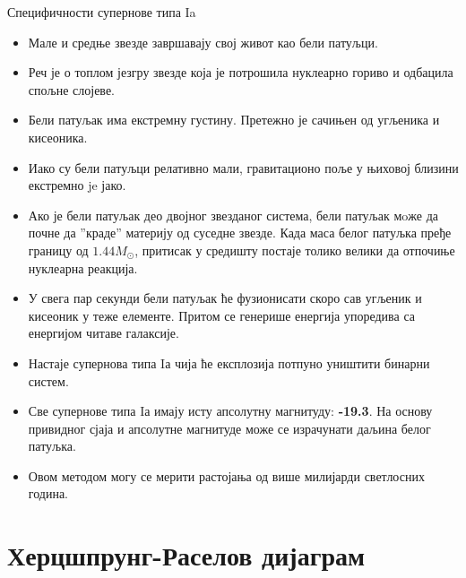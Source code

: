 \documentclass[aspectratio=169, xcolor=table, 10pt]{beamer}
\theoremstyle{definition}
\begin{document}
\begin{frame}{Специфичности супернове типа Ia}
  \begin{itemize}
    \item Мале и средње звезде завршавају свој живот као бели патуљци.
    \item Реч је о топлом језгру звезде која је потрошила нуклеарно гориво и одбацила спољне слојеве.
    \item Бели патуљак има екстремну густину. Претежно је сачињен од угљеника и кисеоника.
    \item Иако су бели патуљци релативно мали, гравитационо поље у њиховој близини екстремно je јако.
    \item Ако је бели патуљак део двојног звезданог система, бели патуљак мoже да почне да ”краде” материју од суседне звезде. Када маса белог патуљка пређе границу од $1.44 M_{\odot}$, притисак у средишту постаје толико велики да отпочиње нуклеарна реакција.
    \item У свега пар секунди бели патуљак ће фузионисати скоро сав угљеник и кисеоник у теже елементе. Притом се генерише енергија упоредива са енергијом читаве галаксије.
    \item Настаје супернова типа Iа чија ће експлозија потпуно уништити бинарни систем.
    \item Све супернове типа Iа имају исту апсолутну магнитуду: \textbf{-19.3}. На основу привидног сјаја и апсолутне магнитуде може се израчунати даљина белог патуљка.
    \item Овом методом могу се мерити растојања од више милијарди светлосних година.
  \end{itemize}
\end{frame}

\section{Херцшпрунг-Раселов дијаграм}
\end{document}
